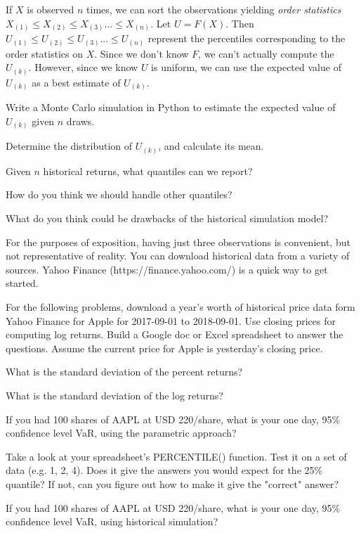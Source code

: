 \documentclass{report}
\numberwithin{problem}{chapter} %
\let\oldroblem\problem
\renewcommand{\problem}{ \oldroblem  \normalfont}
\newcommand{\vs}{\vspace}
\begin{document}
If $X$ is  observed $n$ times, we can sort the observations yielding {\it order statistics} $X_{(1)} \leq X_{(2)} \leq X_{(3)} ...  \leq X_{(n)}$. Let $U=F(X)$. Then $U_{(1)} \leq U_{(2)} \leq U_{(3)} ...  \leq U_{(n)}$ represent the percentiles corresponding to the order statistics on $X$. Since we don't know $F$, we can't actually compute the $U_{(k)}$. However, since we know $U$ is uniform, we can use the expected value of $U_{(k)}$ as a best estimate of $U_{(k)}$.

\problem Write a Monte Carlo simulation in Python to estimate the expected value of  $U_{(k)}$ given $n$ draws. 

\problem Determine the distribution of $U_{(k)}$, and calculate its mean. 

\problem Given $n$ historical returns, what quantiles can we report? 

\problem How do you think we should handle other quantiles?

\problem What do you think could be drawbacks of the historical simulation model?
\vs{3mm}

For the purposes of exposition, having just three observations is convenient, but not representative of reality. You can download historical data from a variety of sources. Yahoo Finance (https://finance.yahoo.com/) is a quick way to get started. 

For the following problems, download a year's worth of historical price data form Yahoo Finance for Apple for 2017-09-01 to 2018-09-01. Use closing prices for computing log returns.  Build a Google doc or Excel spreadsheet to answer the questions. Assume the current price for Apple is yesterday's closing price. 

\problem What is the standard deviation of the percent returns?

\problem What is the standard deviation of the log returns?

\problem If you had 100 shares of AAPL at USD 220/share, what is your one day, 95\% confidence level VaR, using the parametric approach?

\problem Take a look at your spreadsheet's PERCENTILE() function. Test it on a set of data (e.g. {1, 2, 4}). Does it give the answers you would expect for the 25\% quantile? If not, can you figure out how to make it give the "correct" answer?

\problem If you had 100 shares of AAPL at USD 220/share, what is your one day, 95\% confidence level VaR, using  historical simulation?
\end{document}
